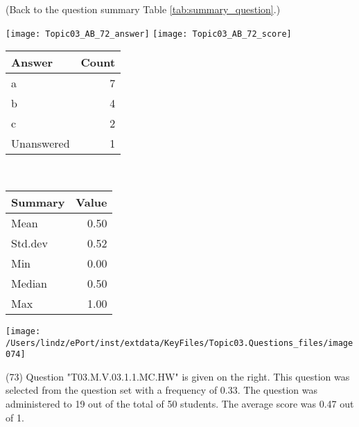 \documentclass[12pt,english,nohyper]{tufte-handout}\usepackage[]{graphicx}\usepackage[]{color}
\begin{document}
 (Back to the question summary Table \ref{tab:summary_question}.)

\begin{center} \texttt{[image: Topic03\_AB\_72\_answer]} \texttt{[image: Topic03\_AB\_72\_score]} \end{center} 

\begin{center}%
\begin{tabular}{lr}
  \hline
Answer & Count \\ 
  \hline
a &   7 \\ 
  b &   4 \\ 
  c &   2 \\ 
  Unanswered &   1 \\ 
   \hline
\end{tabular}
~~~~~~~~%
\begin{tabular}{lr}
  \hline
Summary & Value \\ 
  \hline
Mean & 0.50 \\ 
  Std.dev & 0.52 \\ 
  Min & 0.00 \\ 
  Median & 0.50 \\ 
  Max & 1.00 \\ 
   \hline
\end{tabular}
\end{center}\newpage{}



\vspace{5cm}\begin{marginfigure}\texttt{[image: /Users/lindz/ePort/inst/extdata/KeyFiles/Topic03.Questions\_files/image074]}\end{marginfigure}\vspace{-5cm} (73) Question "T03.M.V.03.1.1.MC.HW" is given on the right. This question was selected from the question set with a frequency of 0.33. The question was administered to 19 out of the total of 50 students. The average score was 0.47 out of 1.
\end{document}
